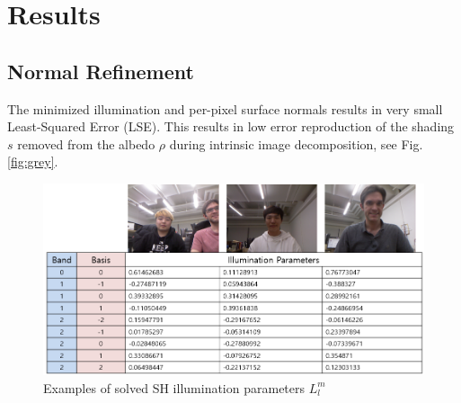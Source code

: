 \documentclass[10pt,twocolumn,letterpaper]{article}
\begin{document}
\section{Results}
\subsection{Normal Refinement}
The minimized illumination and per-pixel surface normals results in very small Least-Squared Error (LSE). This results in low error reproduction of the shading $s$ removed from the albedo $\rho$ during intrinsic image decomposition, see Fig. \ref{fig:grey}. 

\begin{figure}[!h]
    \begin{center}
        \includegraphics [scale=0.33] {image/illum.png}
    \end{center}
    \caption{Examples of solved SH illumination parameters $L_l^m$}
    \label{fig:result-illum}
\end{figure} 
\end{document}
